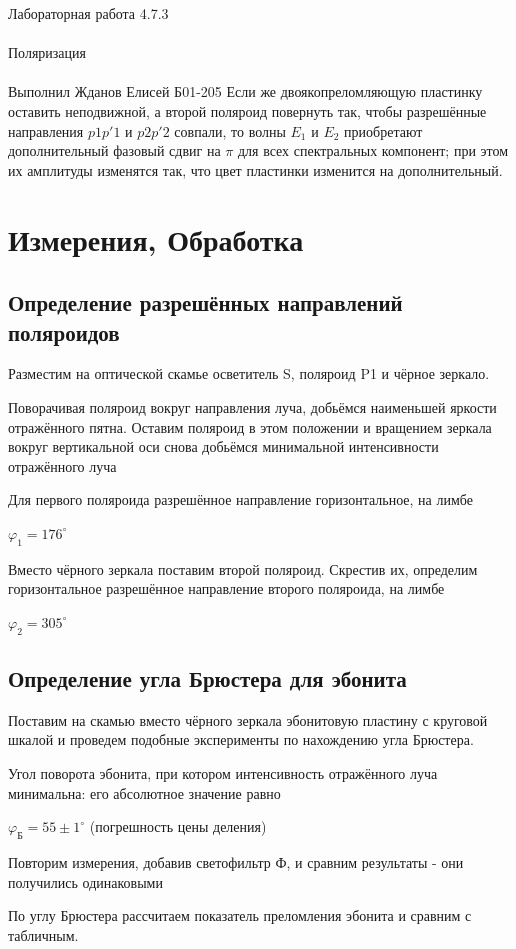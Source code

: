 \documentclass{astroedu-lab}
\begin{document}
\begin{problem}{\huge Лабораторная работа 4.7.3\\\\Поляризация\\\\Выполнил Жданов Елисей Б01-205}
Если же двоякопреломляющую пластинку оставить неподвижной, а
второй поляроид повернуть так, чтобы разрешённые направления $ p1p'1 $
и $ p2p'2 $ совпали, то волны $ E_1 $ и $ E_2 $ приобретают дополнительный фазовый сдвиг на $ \pi $ для всех спектральных компонент; при этом их амплитуды изменятся так, что цвет пластинки изменится на дополнительный. 

\section{Измерения, Обработка}

\subsection{Определение разрешённых направлений поляроидов}

Разместим на оптической скамье осветитель
S, поляроид P1 и чёрное зеркало.

Поворачивая поляроид вокруг направления луча, добьёмся наименьшей яркости отражённого пятна. Оставим поляроид в этом положении и вращением зеркала вокруг вертикальной оси снова добьёмся минимальной интенсивности отражённого луча

Для первого поляроида разрешённое направление горизонтальное, на лимбе

$\varphi_1 = 176^{\circ}$

Вместо чёрного зеркала поставим второй поляроид. Скрестив их, определим горизонтальное разрешённое направление второго поляроида, на лимбе

$\varphi_2 = 305^{\circ}$

\subsection{Определение угла Брюстера для эбонита}

Поставим на скамью вместо чёрного зеркала эбонитовую пластину с круговой шкалой и проведем подобные эксперименты по нахождению угла Брюстера.

Угол поворота эбонита, при котором интенсивность
отражённого луча минимальна: его абсолютное значение равно

$\varphi_\text{Б} = 55 \pm 1^{\circ}$ (погрешность цены деления)

Повторим измерения, добавив светофильтр Ф, и сравним результаты - они получились одинаковыми

По углу Брюстера рассчитаем показатель преломления эбонита и сравним с табличным.


\end{problem}
\end{document}
